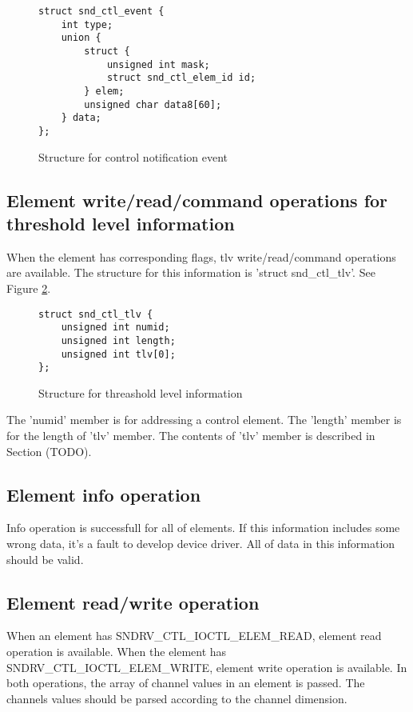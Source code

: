 \documentclass[onecolumn]{article}
\begin{document}
\begin{figure}[htbp]
\small
\begin{verbatim}
struct snd_ctl_event {
    int type;
    union {
        struct {
            unsigned int mask;
            struct snd_ctl_elem_id id;
        } elem;
        unsigned char data8[60];
    } data;
};
\end{verbatim}
\caption{{Structure for control notification event}}
\label{snd-ctl-event}
\end{figure}

\subsection{Element write/read/command operations for threshold level information}

When the element has corresponding flags, tlv write/read/command operations are available. The structure for this information is 'struct snd\_ctl\_tlv'. See Figure \ref{fig:snd-ctl-tlv}.

\begin{figure}[htbp]
\small
\begin{verbatim}
struct snd_ctl_tlv {
    unsigned int numid;
    unsigned int length;
    unsigned int tlv[0];
};
\end{verbatim}
\caption{{Structure for threashold level information}}
\label{fig:snd-ctl-tlv}
\end{figure}

The 'numid' member is for addressing a control element. The 'length' member is for the length of 'tlv' member. The contents of 'tlv' member is described in Section (TODO).

\subsection{Element info operation}

Info operation is successfull for all of elements. If this information includes some wrong data, it's a fault to develop device driver. All of data in this information should be valid.

\subsection{Element read/write operation}

When an element has SNDRV\_CTL\_IOCTL\_ELEM\_READ, element read operation is available. When the element has SNDRV\_CTL\_IOCTL\_ELEM\_WRITE, element write operation is available. In both operations, the array of channel values in an element is passed. The channels values should be parsed according to the channel dimension.
\end{document}
